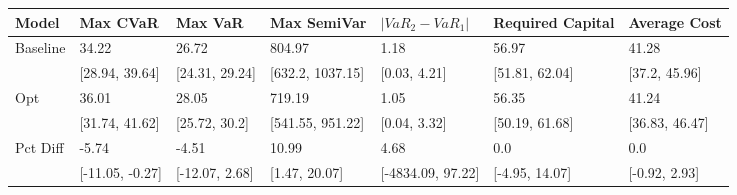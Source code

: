 \begin{tabular}{lllllll}
\toprule
   Model &        Max CVaR &        Max VaR &      Max SemiVar & $|VaR_2 - VaR_1|$ & Required Capital &   Average Cost \\
\midrule
Baseline &           34.22 &          26.72 &           804.97 &              1.18 &            56.97 &          41.28 \\
         &  [28.94, 39.64] & [24.31, 29.24] & [632.2, 1037.15] &      [0.03, 4.21] &   [51.81, 62.04] &  [37.2, 45.96] \\
     Opt &           36.01 &          28.05 &           719.19 &              1.05 &            56.35 &          41.24 \\
         &  [31.74, 41.62] &  [25.72, 30.2] & [541.55, 951.22] &      [0.04, 3.32] &   [50.19, 61.68] & [36.83, 46.47] \\
Pct Diff &           -5.74 &          -4.51 &            10.99 &              4.68 &              0.0 &            0.0 \\
         & [-11.05, -0.27] & [-12.07, 2.68] &    [1.47, 20.07] & [-4834.09, 97.22] &   [-4.95, 14.07] &  [-0.92, 2.93] \\
\bottomrule
\end{tabular}
